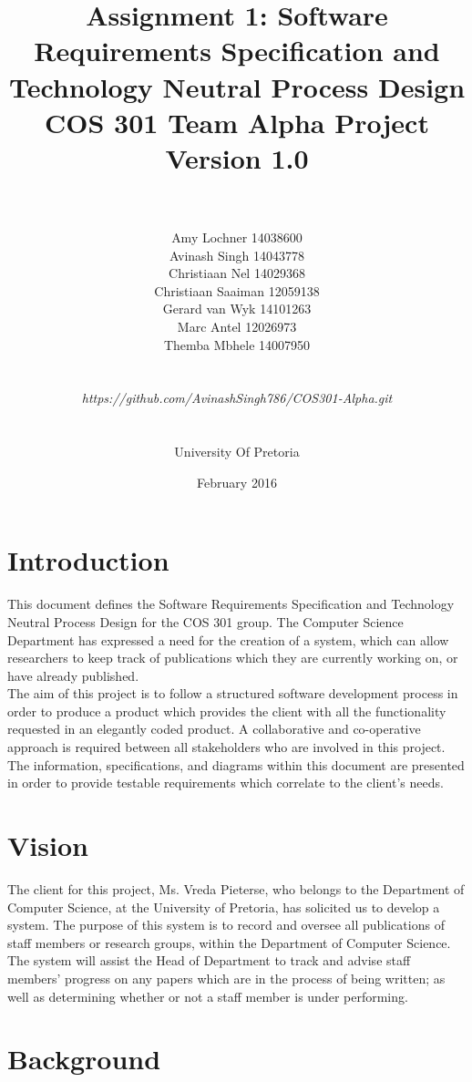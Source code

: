 \documentclass[a4paper]{article}
\title{\huge Assignment 1: Software Requirements Specification and Technology Neutral Process Design
	\\COS 301 Team Alpha Project
	\\Version 1.0}
\author{\\\\Amy Lochner 14038600\\ Avinash Singh 14043778 \\
	Christiaan Nel 14029368\\ Christiaan Saaiman 12059138 \\
	Gerard van Wyk 14101263\\ Marc Antel 12026973\\
	Themba Mbhele 14007950
	\\
	\\
	\\\textit{https://github.com/AvinashSingh786/COS301-Alpha.git}
	\\
	\\
	\\ University Of Pretoria\\}
\date{February 2016}
\begin{document}
	
	\maketitle
	\newpage
	
	
	
	\tableofcontents
	\newpage
	
	\section{Introduction}
	
	This document defines the Software Requirements Specification and Technology Neutral Process Design for the COS 301 group. The Computer Science Department has expressed a need for the creation of a system, which can allow researchers to keep track of publications which they are currently working on, or have already published.
	\\
	The aim of this project is to follow a structured software development process in order to produce a product which provides the client with all the functionality requested in an elegantly coded product. A collaborative and co-operative approach is required between all stakeholders who are involved in this project. 
	\\
	The information, specifications, and diagrams within this document are presented in order to provide testable requirements which correlate to the client's needs.
	
	\section{Vision}
	The client for this project, Ms. Vreda Pieterse, who belongs to the Department of Computer Science, at the University of Pretoria, has solicited us to develop a system. The purpose of this system is to record and oversee all publications of staff members or research groups, within the Department of Computer Science. The system will assist the Head of Department to track and advise staff members' progress on any papers which are in the process of being written; as well as determining whether or not a staff member is under performing.
	
	\section{Background}
\end{document}

